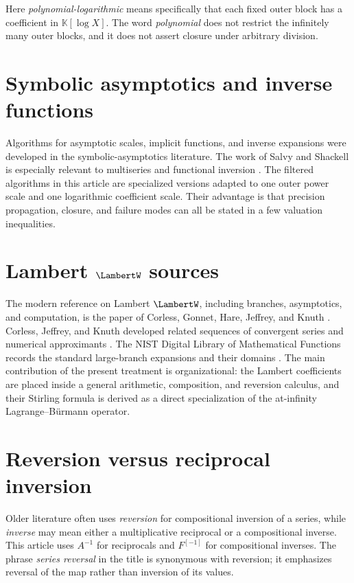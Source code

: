 \documentclass[11pt,oneside,openany]{book}
\newcommand{\K}{\mathbb{K}}
\begin{document}
Here \emph{polynomial-logarithmic} means specifically that each fixed outer
block has a coefficient in \(\K[\log X]\).  The word \emph{polynomial} does
not restrict the infinitely many outer blocks, and it does not assert closure
under arbitrary division.

\section{Symbolic asymptotics and inverse functions}
Algorithms for asymptotic scales, implicit functions, and inverse expansions
were developed in the symbolic-asymptotics literature.  The work of Salvy and
Shackell is especially relevant to multiseries and functional inversion
\cite{SalvyShackell1992,SalvyShackell1998,SalvyShackell1999}.  The filtered
algorithms in this article are specialized versions adapted to one outer power
scale and one logarithmic coefficient scale.  Their advantage is that
precision propagation, closure, and failure modes can all be stated in a few
valuation inequalities.

\section{Lambert \texorpdfstring{\(\LambertW\)}{W} sources}
The modern reference on Lambert \(\LambertW\), including branches, asymptotics, and
computation, is the paper of Corless, Gonnet, Hare, Jeffrey, and Knuth
\cite{Corless1996}.  Corless, Jeffrey, and Knuth developed related sequences
of convergent series and numerical approximants \cite{JeffreyCorlessKnuth1997}.
The NIST Digital Library of Mathematical Functions records the standard
large-branch expansions and their domains \cite{DLMF}.  The main contribution
of the present treatment is organizational: the Lambert coefficients are
placed inside a general arithmetic, composition, and reversion calculus, and
their Stirling formula is derived as a direct specialization of the
at-infinity Lagrange--B\"urmann operator.

\section{Reversion versus reciprocal inversion}
Older literature often uses \emph{reversion} for compositional inversion of a
series, while \emph{inverse} may mean either a multiplicative reciprocal or a
compositional inverse.  This article uses \(A^{-1}\) for reciprocals and
\(F^{[-1]}\) for compositional inverses.  The phrase \emph{series reversal}
in the title is synonymous with reversion; it emphasizes reversal of the map
rather than inversion of its values.
\end{document}
